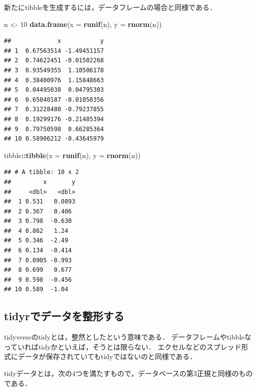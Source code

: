 \documentclass[
]{article}
\newenvironment{Shaded}{\begin{snugshade}}{\end{snugshade}}
\newcommand{\AttributeTok}[1]{\textcolor[rgb]{0.13,0.29,0.53}{#1}}
\newcommand{\DecValTok}[1]{\textcolor[rgb]{0.00,0.00,0.81}{#1}}
\newcommand{\FunctionTok}[1]{\textcolor[rgb]{0.13,0.29,0.53}{\textbf{#1}}}
\newcommand{\NormalTok}[1]{#1}
\newcommand{\OtherTok}[1]{\textcolor[rgb]{0.56,0.35,0.01}{#1}}
\newcommand{\SpecialCharTok}[1]{\textcolor[rgb]{0.81,0.36,0.00}{\textbf{#1}}}
\begin{document}
新たにtibbleを生成するには，データフレームの場合と同様である．

\begin{Shaded}
\begin{Highlighting}[]
\NormalTok{n }\OtherTok{\textless{}{-}} \DecValTok{10}
\FunctionTok{data.frame}\NormalTok{(}\AttributeTok{x =} \FunctionTok{runif}\NormalTok{(n), }\AttributeTok{y =} \FunctionTok{rnorm}\NormalTok{(n))}
\end{Highlighting}
\end{Shaded}

\begin{verbatim}
##             x           y
## 1  0.67563514 -1.49451157
## 2  0.74622451 -0.01502268
## 3  0.93549355  1.10506178
## 4  0.38400976  1.15848663
## 5  0.04495038  0.04795303
## 6  0.65040187 -0.01050356
## 7  0.31228480 -0.79237855
## 8  0.19299176 -0.21485394
## 9  0.79750598  0.66285364
## 10 0.58906212 -0.43645979
\end{verbatim}

\begin{Shaded}
\begin{Highlighting}[]
\NormalTok{tibble}\SpecialCharTok{::}\FunctionTok{tibble}\NormalTok{(}\AttributeTok{x =} \FunctionTok{runif}\NormalTok{(n), }\AttributeTok{y =} \FunctionTok{rnorm}\NormalTok{(n))}
\end{Highlighting}
\end{Shaded}

\begin{verbatim}
## # A tibble: 10 x 2
##         x       y
##     <dbl>   <dbl>
##  1 0.531   0.0893
##  2 0.367   0.406 
##  3 0.798  -0.630 
##  4 0.862   1.24  
##  5 0.346  -2.49  
##  6 0.134  -0.414 
##  7 0.0905 -0.993 
##  8 0.699   0.677 
##  9 0.598  -0.456 
## 10 0.589  -1.04
\end{verbatim}

\hypertarget{tidyrux3067ux30c7ux30fcux30bfux3092ux6574ux5f62ux3059ux308b}{%
\subsection{tidyrでデータを整形する}\label{tidyrux3067ux30c7ux30fcux30bfux3092ux6574ux5f62ux3059ux308b}}

tidyverseのtidyとは，整然としたという意味である．
データフレームやtibbleなっていればtidyかといえば，そうとは限らない．
エクセルなどのスプレッド形式にデータが保存されていてもtidyではないのと同様である．

tidyデータとは，次の4つを満たすもので，データベースの第3正規と同様のものである．
\end{document}
